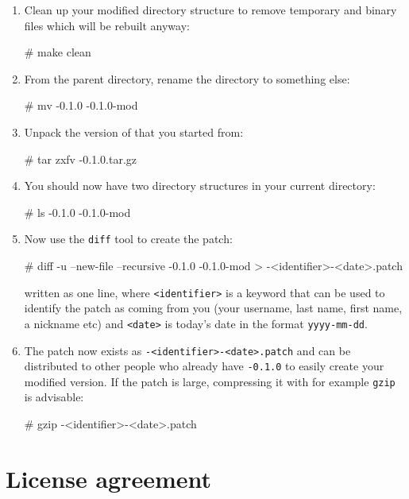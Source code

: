 \begin{enumerate}
\item
  Clean up your modified directory structure to remove temporary and binary
  files which will be rebuilt anyway:
  \begin{code}
    # make clean
  \end{code}
\item
  From the parent directory, rename the \package{} directory to something else:
  \begin{code}
    # mv \packagett{}-0.1.0 \packagett{}-0.1.0-mod
  \end{code}
\item
  Unpack the version of \package{} that you started from:
  \begin{code}
    # tar zxfv \packagett{}-0.1.0.tar.gz
  \end{code}
\item
  You should now have two \package{} directory structures in your current directory:
  \begin{code}
    # ls
    \packagett{}-0.1.0
    \packagett{}-0.1.0-mod
  \end{code}
\item
  Now use the \texttt{diff} tool to create the patch:
  \begin{code}
    # diff -u --new-file --recursive \packagett{}-0.1.0
      \packagett{}-0.1.0-mod > \packagett{}-<identifier>-<date>.patch
  \end{code}
  written as one line, where \texttt{<identifier>} is a keyword that
  can be used to identify the patch as coming from you (your username,
  last name, first name, a nickname etc) and \texttt{<date>} is
  today's date in the format \texttt{yyyy-mm-dd}.
\item
  The patch now exists as \texttt{\packagett{}-<identifier>-<date>.patch}
  and can be distributed to other people who already have
  \texttt{\packagett{}-0.1.0} to easily create your modified version. If the
  patch is large, compressing it with for example \texttt{gzip} is
  advisable:
  \begin{code}
    # gzip \packagett{}-<identifier>-<date>.patch
  \end{code}
\end{enumerate}

\section{License agreement}

